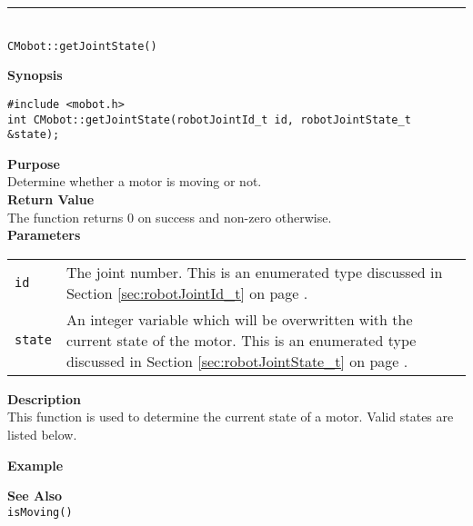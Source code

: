 \noindent
\vspace{5pt}
\rule{4.5in}{0.015in}\\
\noindent
{\LARGE \texttt{CMobot::getJointState()}}\\
{}

\noindent
{\bf Synopsis}
\vspace{-8pt}
\begin{verbatim}
#include <mobot.h>
int CMobot::getJointState(robotJointId_t id, robotJointState_t &state);
\end{verbatim}

\noindent
{\bf Purpose}\\
Determine whether a motor is moving or not.\\

\noindent
{\bf Return Value}\\
The function returns 0 on success and non-zero otherwise.\\

\noindent
{\bf Parameters}
\vspace{-0.1in}
\begin{description}
\item               
\begin{tabular}{p{10 mm}p{145 mm}}
\texttt{id} & The joint number. This is an enumerated type 
discussed in Section \ref{sec:robotJointId_t} on page
\pageref{sec:robotJointId_t}.\\
\texttt{state} & An integer variable which will be overwritten with the current state of the motor. 
This is an enumerated type 
discussed in Section \ref{sec:robotJointState_t} on page
\pageref{sec:robotJointState_t}.
\end{tabular}
\end{description}

\noindent
{\bf Description}\\
This function is used to determine the current state of a motor. Valid states are listed below.


\noindent
{\bf Example}\\
\noindent

\noindent
{\bf See Also}\\
\texttt{isMoving()}\\
